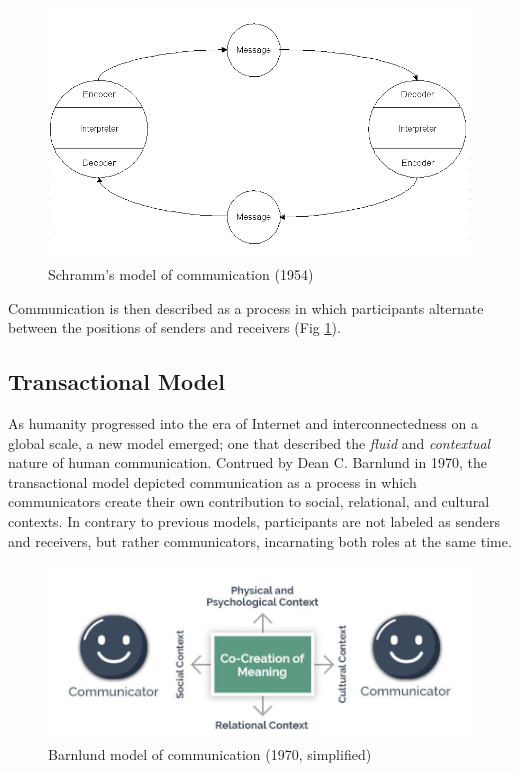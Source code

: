 \documentclass[12pt]{article}
\begin{document}
\begin{figure}[htp]
    \centering
    \includegraphics[width=\textwidth]{int.png}
    \caption{Schramm's model of communication (1954)}
    \label{int}
\end{figure}

Communication is then described as a process in which participants alternate between the positions of senders and receivers (Fig \ref{int}).

\subsection{Transactional Model}

As humanity progressed into the era of Internet and interconnectedness on a global scale, a new model emerged; one that described the \textit{fluid} and \textit{contextual} nature of human communication. Contrued by Dean C. Barnlund in 1970\cite{barnlund}, the transactional model depicted communication as a process in which communicators create their own contribution to social, relational, and cultural contexts. In contrary to previous models, participants are not labeled as senders and receivers, but rather communicators, incarnating both roles at the same time.

\begin{figure}[htp]
    \centering
    \includegraphics[width=\textwidth]{tra.png}
    \caption{Barnlund model of communication (1970, simplified\cite{transactional})}
    \label{tra}
\end{figure}
\end{document}
